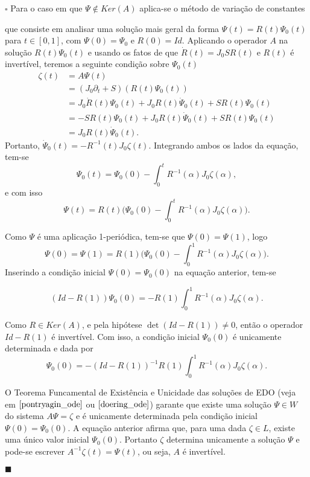 \documentclass[12pt]{book}
\newenvironment{prova}[1]{$\square$ #1}{\hfill$\blacksquare$}
\newcommand{\derivadaparcialabrev}[1]{\partial_{#1}}
\newcommand{\estruturacomplexa}{J_{0}}
\newcommand{\alerta}[1]{{\color{red}#1}}
\begin{document}
\begin{prova}
		Para o caso em que $\Psi \notin Ker(A)$ aplica-se o método de variação de constantes 
		\begin{comment}
			\alerta{(procurar uma referencia)} 
		\end{comment}
		que consiste em analisar uma solução mais geral da forma $\Psi(t) = R(t)\Psi_{0}(t)$ para $t \in [0,1]$, com $\Psi(0) = \Psi_{0}$ e $R(0) = Id$. Aplicando o operador $A$ na solução $R(t)\Psi_{0}(t)$ e usando os fatos de que $\dot{R}(t) = \estruturacomplexa SR(t)$ e $R(t)$ é invertível, teremos a seguinte condição sobre $\Psi_{0}(t)$
		$$
		\begin{aligned}
		\zeta(t) 
		&= A\Psi(t)
		\\ 
		&= (\estruturacomplexa\derivadaparcialabrev{t}+S)(R(t)\Psi_{0}(t)) 
		\\ 
		&= \estruturacomplexa\dot{R}(t)\Psi_{0}(t)+\estruturacomplexa R(t)\dot{\Psi}_{0}(t) + SR(t)\Psi_{0}(t)
		\\
		&= -SR(t)\Psi_{0}(t)+\estruturacomplexa R(t)\dot{\Psi}_{0}(t) + SR(t)\Psi_{0}(t)
		\\
		&= \estruturacomplexa R(t)\dot{\Psi}_{0}(t).
		\end{aligned}
		$$
		Portanto, $\dot{\Psi}_{0}(t) = -R^{-1}(t)\estruturacomplexa \zeta(t)
		$. Integrando ambos os lados da equação, tem-se
		$$
		\Psi_{0}(t) = \Psi_{0}(0)-\int_{0}^{t} R^{-1}(\alpha)\estruturacomplexa \zeta(\alpha),
		$$
		e com isso
		$$
		\Psi(t) = R(t)\Big(\Psi_{0}(0)-\int_{0}^{t} R^{-1}(\alpha)\estruturacomplexa \zeta(\alpha)\Big).
		$$
		
		Como $\Psi$ é uma aplicação 1-periódica, tem-se que $\Psi(0) = \Psi(1)$, logo
		$$
		\Psi(0)=\Psi(1)=R(1)\Big(\Psi_{0}(0)-\int_{0}^{1} R^{-1}(\alpha)\estruturacomplexa \zeta(\alpha)\Big).
		$$
		Inserindo a condição inicial $\Psi(0)=\Psi_{0}(0)$ na equação anterior, tem-se
		
		$$
		(Id - R(1))\Psi_{0}(0) = -R(1)\int_{0}^{1} R^{-1}(\alpha)\estruturacomplexa \zeta(\alpha).
		$$
		
		Como $R \in Ker(A)$, e pela hipótese $\det(Id - R(1))\neq 0$, então o operador $Id - R(1)$ é invertível. Com isso, a condição inicial $\Psi_{0}(0)$ é unicamente determinada e dada por
		$$
		\Psi_{0}(0) = -(Id - R(1))^{-1}R(1)\int_{0}^{1} R^{-1}(\alpha)\estruturacomplexa \zeta(\alpha).
		$$
		
		O Teorema Funcamental de Existência e Unicidade das soluções de EDO (veja em $\cite{pontryagin_ode}$ ou $\cite{doering_ode}$) garante que existe uma solução $\Psi \in W$ do sistema $A\Psi = \zeta$ e é unicamente determinada pela condição inicial $\Psi(0) = \Psi_{0}(0)$. A equação anterior afirma que, para uma dada $\zeta \in L$, existe uma único valor inicial $\Psi_{0}(0)$. Portanto $\zeta$ determina unicamente a solução $\Psi$ e pode-se escrever $A^{-1}\zeta(t)=\Psi(t)$, ou seja, $A$ é invertível.
		

\end{prova}
\end{document}
